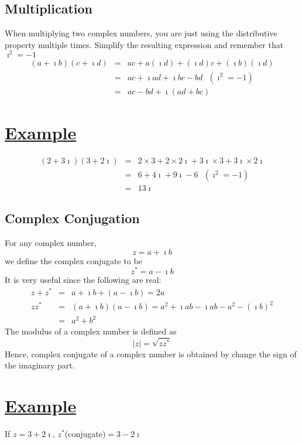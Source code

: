 \documentclass[11pt]{report}
\newcommand{\ubt}[1]{\textbf{\underline{#1}}}
\newcommand{\sps}{\\[0.2cm]}
\newcommand{\imaginary}{\imath}
\newcommand{\example}[1]{\section*{\ubt{Example #1}}}
\begin{document}
	\subsection{Multiplication}
	When multiplying two complex numbers, you are just using the distributive property multiple times. Simplify the resulting expression and remember that $\imaginary^2 = -1$
	\begin{eqnarray*}
		(a+\imaginary b)(c+\imaginary d) &=& ac + a(\imaginary d)+(\imaginary d)c + (\imaginary b)(\imaginary d)\\
		&=& ac + \imaginary ad + \imaginary bc - bd ~~~ (\imaginary^2 = -1)\\
		&=& ac - bd + \imaginary(ad + bc)
	\end{eqnarray*}
	\example{}
	\begin{eqnarray*}
		(2+3\imaginary)(3+2\imaginary) &=& 2\times 3 + 2\times 2\imaginary + 3\imaginary\times 3 + 3\imaginary \times 2\imaginary\\
		&=&6 + 4\imaginary + 9\imaginary - 6 ~~~ (\imaginary^2 = -1)\\
		&=&13\imaginary
	\end{eqnarray*}
	
	\subsection{Complex Conjugation}
	For any complex number,
	\begin{equation}
		z=a+\imaginary b\label{eq:1_13}
	\end{equation}
	we define the complex conjugate to be
	\begin{equation}
		z^{*} = a-\imaginary b\label{eq:1_14}
	\end{equation}
	It is very useful since the following are real:
	\begin{eqnarray*}
		z+z^{*}&=&a+\imaginary b + (a-\imaginary b) = 2a\sps
		zz^{*} &=&(a+\imaginary b)(a-\imaginary b) = a^2 + \imaginary ab - \imaginary ab - a^2 - (\imaginary b)^2\\
		&=& a^2 + b^2
	\end{eqnarray*}
	The modulus of a complex number is defined as 
	\begin{equation}
		|z| = \sqrt{zz^{*}}
	\end{equation}
	Hence, complex conjugate of a complex number is obtained by change the sign of the imaginary part.
	\example{}
	If $z=3+2\imaginary$, $z^{*}$(conjugate)$=3-2\imaginary$
	
\end{document}
